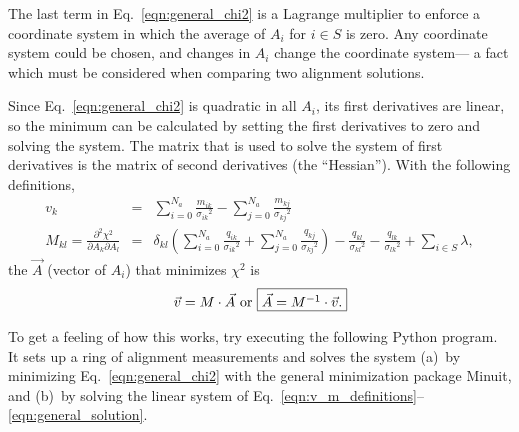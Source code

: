 \documentclass[12pt]{article}
\begin{document}
The last term in Eq.~\ref{eqn:general_chi2} is a Lagrange multiplier
to enforce a coordinate system in which the average of $A_i$ for $i
\in S$ is zero.  Any coordinate system could be chosen, and changes in
$A_i$ change the coordinate system--- a fact which must be considered
when comparing two alignment solutions.

Since Eq.~\ref{eqn:general_chi2} is quadratic in all $A_i$, its first
derivatives are linear, so the minimum can be calculated by setting
the first derivatives to zero and solving the system.  The matrix that
is used to solve the system of first derivatives is the matrix of
second derivatives (the ``Hessian'').  With the following definitions,
\begin{eqnarray}
v_k &=& \sum_{i=0}^{N_a} \frac{m_{ik}}{{\sigma_{ik}}^2} - \sum_{j=0}^{N_a} \frac{m_{kj}}{{\sigma_{kj}}^2} \\
M_{kl} = \frac{\partial^2 \chi^2}{\partial A_k \partial A_l} &=& \delta_{kl} \left(\sum_{i=0}^{N_a} \frac{q_{ik}}{{\sigma_{ik}}^2} + \sum_{j=0}^{N_a} \frac{q_{kj}}{{\sigma_{kj}}^2} \right) - \frac{q_{kl}}{{\sigma_{kl}}^2} - \frac{q_{lk}}{{\sigma_{lk}}^2}
+ \sum_{i \in S} \lambda,
\label{eqn:v_m_definitions}
\end{eqnarray}
the $\vec{A}$ (vector of $A_i$) that minimizes $\chi^2$ is
\begin{equation}
\vec{v} = M \cdot \vec{A} \mbox{ or } \fbox{$\vec{A} = M^{-1} \cdot \vec{v}$.}
\label{eqn:general_solution}
\end{equation}

To get a feeling of how this works, try executing the following Python
program.  It sets up a ring of alignment measurements and solves the
system (a)~by minimizing Eq.~\ref{eqn:general_chi2} with the general
minimization package Minuit, and (b)~by solving the linear system of
Eq.~\ref{eqn:v_m_definitions}--\ref{eqn:general_solution}.
\end{document}
